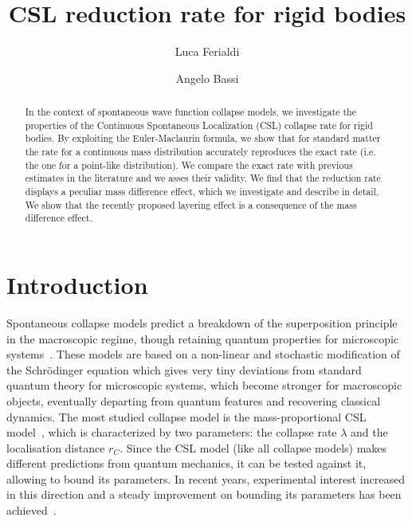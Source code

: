 \documentclass[11pt,onecolumn,amssymb,nofootinbib]{revtex4}
\begin{document}
\title{CSL reduction rate for rigid bodies}

\author{Luca Ferialdi}
 

\author{Angelo Bassi}
 

\begin{abstract}
In the context of spontaneous wave function collapse models, we investigate the properties of the Continuous Spontaneous Localization (CSL) collapse rate for rigid bodies. By exploiting the Euler-Maclaurin formula, we show that for standard matter the rate for a continuous mass distribution accurately reproduces the exact rate (i.e. the one for a point-like distribution). We compare the exact rate with previous estimates in the literature and we asses their validity. We find that the reduction rate displays a peculiar mass difference effect, which we investigate and describe in detail. We show that the recently proposed layering effect is a consequence of the mass difference effect.
\end{abstract}




\maketitle

\section{Introduction}
Spontaneous collapse models predict a breakdown of the superposition principle in the macroscopic regime, though retaining quantum properties for microscopic systems~\cite{rep1,rep2}. These models are based on a non-linear and stochastic modification of the Schr\"odinger equation which gives very tiny deviations from standard quantum theory for microscopic systems, which become stronger for macroscopic objects, eventually departing from quantum features and recovering classical dynamics.
The most studied collapse model is the mass-proportional CSL model~\cite{CSL}, which is characterized by two parameters: the collapse rate $\lambda$ and the localisation distance $r_C$.
Since the CSL model (like all collapse models) makes different predictions from quantum mechanics, it can be tested against it, allowing to bound its parameters. In recent years, experimental interest increased in this direction and a steady improvement on bounding its parameters has been achieved~\cite{Curetal16,Vinetal16,Biletal16,Pisetal17,Vinetal17,Heletal17,Caretal18,Zheetal20}.
\end{document}
